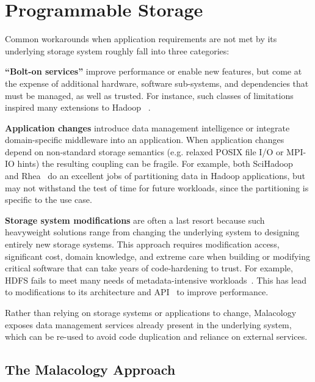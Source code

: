 \section{Programmable Storage}
\label{sec:progly}

Common workarounds when application requirements are not met
by its underlying storage system roughly fall into three categories:

{\bf ``Bolt-on services''} improve performance
or enable new features, but come at the expense of additional hardware, software
sub-systems, and dependencies that must be managed, as well as trusted.
For instance, such classes of limitations inspired many extensions to Hadoop
~\cite{bu:vldb2010-haloop, ekanayake:hpdc2010-twister,
ekanayake:escience2008-eglmapreduce, mihailescu:hotstorage2012-mixapart}.

{\bf Application changes} introduce data management intelligence or integrate
domain-specific middleware into an application.
When application changes depend on non-standard storage semantics
(e.g. relaxed POSIX file I/O or MPI-IO hints) the resulting coupling 
can be fragile.
For example, both SciHadoop~\cite{buck:hpc2011-scihadoop} and Rhea~\cite{gkantsidis:nsdi2013-rhea} do
an excellent jobs of partitioning data in Hadoop applications, but may not
withstand the test of time for future workloads, since the partitioning is
specific to the use case.

{\bf Storage system modifications} are often a last resort because such
heavyweight solutions range from changing the underlying system to
designing entirely new storage systems. This approach requires modification
access, significant cost, domain knowledge, and extreme care when building or
modifying critical software that can take years of code-hardening to trust.
For example, HDFS fails to meet many needs of metadata-intensive
workloads~\cite{shvachko:login2012-hdfs-scalability}.  This has lead to
modifications to its architecture and API~\cite{balmin:sigmod2012-clydesdale}
to improve performance.

Rather than relying on storage systems or applications to change, Malacology
exposes data management services already present in the underlying system,
which can be re-used to avoid code duplication and reliance on external
services.

\subsection{The Malacology Approach}

